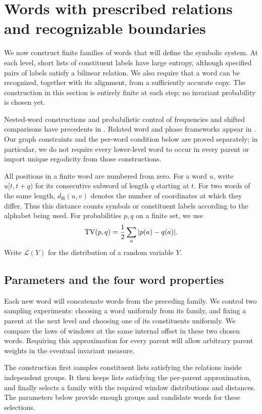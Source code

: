 \section{Words with prescribed relations and recognizable boundaries}
\label{sec:words}

We now construct finite families of words that will define the symbolic
system.  At each level, short lists of constituent labels have large
entropy, although specified pairs of labels satisfy a bilinear relation.
We also require that a word can be recognized, together with its alignment,
from a sufficiently accurate copy.  The construction in this section is
entirely finite at each step; no invariant probability is chosen yet.

Nested-word constructions and probabilistic control of frequencies and
shifted comparisons have precedents in
\cite[\S4.1 and Proposition~43]{ForemanRudolphWeiss2011}.
Related word and phase frameworks appear in
\cite[\S\S4.2.3--4.2.4]{ForemanWeiss2022}. Our graph constraints and the
per-word condition below are proved separately; in particular, we do
not require every lower-level word to occur in every parent or import
unique ergodicity from those constructions.

All positions in a finite word are numbered from zero.  For a word $u$,
write $u[t,t+q)$ for its consecutive subword of length $q$ starting at $t$.
For two words of the same length, $d_{\mathrm H}(u,v)$ denotes the number
of coordinates at which they differ.  Thus this distance counts symbols
or constituent labels according to the alphabet being used.  For
probabilities $p,q$ on a finite set, we use
\[
  \operatorname{TV}(p,q)=\frac12\sum_a |p(a)-q(a)|.
\]
Write $\mathcal L(Y)$ for the distribution of a random variable $Y$.

\subsection{Parameters and the four word properties}

Each new word will concatenate words from the preceding family.
We control two sampling experiments: choosing a word uniformly from
its family, and fixing a parent at the next level and choosing one of
its constituents uniformly. We compare the laws of windows at the
same internal offset in these two chosen words. Requiring this
approximation for every parent will allow arbitrary parent weights
in the eventual invariant measure.

The construction first samples constituent lists satisfying the
relations inside independent groups. It then keeps lists satisfying
the per-parent approximation, and finally selects a family with the
required window distributions and distances. The parameters below
provide enough groups and candidate words for these selections.

